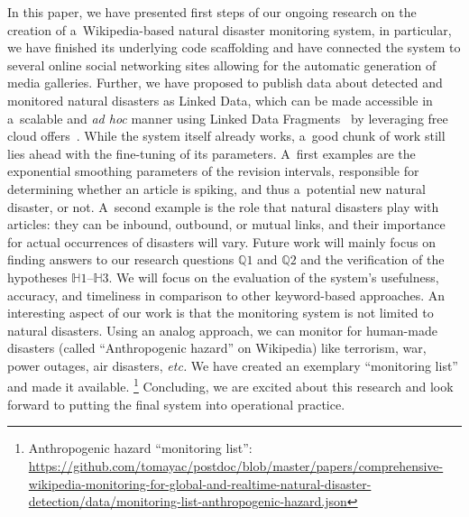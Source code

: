 \documentclass[letterpaper]{article}
\begin{document}
In this paper, we have presented first steps of our ongoing research
on the creation of a~Wikipedia-based natural disaster monitoring system,
in particular, we have finished its underlying code scaffolding
and have connected the system to several online social networking sites
allowing for the automatic generation of media galleries.
Further, we have proposed to publish data about detected
and monitored natural disasters as Linked Data,
which can be made accessible in a~scalable and \emph{ad hoc} manner
using Linked Data Fragments~\cite{verborgh2014ldfiswc}
by leveraging free cloud offers~\cite{DBLP:conf/semweb/MatteisV14}.
While the system itself already works, a~good chunk of work still lies ahead
with the fine-tuning of its parameters.
A~first examples are the exponential smoothing parameters
of the revision intervals, responsible for determining whether an article
is spiking, and thus a~potential new natural disaster, or not.
A~second example is the role that natural disasters play with articles:
they can be inbound, outbound, or mutual links,
and their importance for actual occurrences of disasters will vary.
Future work will mainly focus on finding answers to our research questions
$\mathbb{Q}1$ and $\mathbb{Q}2$ and the verification of the hypotheses
$\mathbb{H}1$--$\mathbb{H}3$.
We will focus on the evaluation of the system's usefulness, accuracy,
and timeliness in comparison to other keyword-based approaches.
An interesting aspect of our work is that the monitoring system
is not limited to natural disasters.
Using an analog approach, we can monitor for human-made disasters
(called ``Anthropogenic hazard'' on Wikipedia)
like terrorism, war, power outages, air disasters, \emph{etc.}
We have created an exemplary ``monitoring list'' and made it available.%
\footnote{Anthropogenic hazard ``monitoring list'':
\url{https://github.com/tomayac/postdoc/blob/master/papers/comprehensive-wikipedia-monitoring-for-global-and-realtime-natural-disaster-detection/data/monitoring-list-anthropogenic-hazard.json}}
Concluding, we are excited about this research
and look forward to putting the final system into operational practice.



\end{document}
